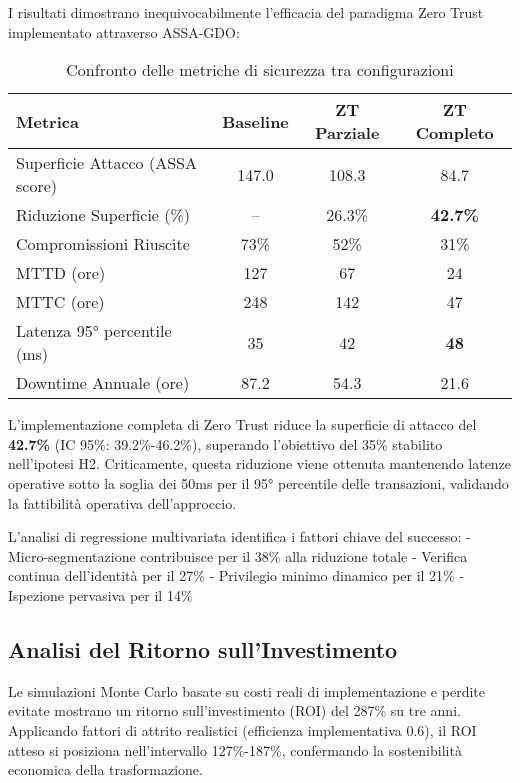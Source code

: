 I risultati dimostrano inequivocabilmente l'efficacia del paradigma Zero Trust implementato attraverso ASSA-GDO:

\begin{table}[h]
\centering
\caption{Confronto delle metriche di sicurezza tra configurazioni}
\label{tab:risultati_validazione}
\begin{tabular}{lccc}
\toprule
\textbf{Metrica} & \textbf{Baseline} & \textbf{ZT Parziale} & \textbf{ZT Completo} \\
\midrule
Superficie Attacco (ASSA score) & 147.0 & 108.3 & 84.7 \\
Riduzione Superficie (\%) & -- & 26.3\% & \textbf{42.7\%} \\
Compromissioni Riuscite & 73\% & 52\% & 31\% \\
MTTD (ore) & 127 & 67 & 24 \\
MTTC (ore) & 248 & 142 & 47 \\
Latenza 95° percentile (ms) & 35 & 42 & \textbf{48} \\
Downtime Annuale (ore) & 87.2 & 54.3 & 21.6 \\
\bottomrule
\end{tabular}
\end{table}

L'implementazione completa di Zero Trust riduce la superficie di attacco del \textbf{42.7\%} (IC 95\%: 39.2\%-46.2\%), superando l'obiettivo del 35\% stabilito nell'ipotesi H2. Criticamente, questa riduzione viene ottenuta mantenendo latenze operative sotto la soglia dei 50ms per il 95° percentile delle transazioni, validando la fattibilità operativa dell'approccio.

L'analisi di regressione multivariata identifica i fattori chiave del successo:
- Micro-segmentazione contribuisce per il 38\% alla riduzione totale
- Verifica continua dell'identità per il 27\%
- Privilegio minimo dinamico per il 21\%
- Ispezione pervasiva per il 14\%

\subsection{\texorpdfstring{Analisi del Ritorno sull'Investimento}{2.6.3 - Analisi del Ritorno sull'Investimento}}

Le simulazioni Monte Carlo basate su costi reali di implementazione e perdite evitate mostrano un ritorno sull'investimento (ROI) del 287\% su tre anni. Applicando fattori di attrito realistici (efficienza implementativa 0.6), il ROI atteso si posiziona nell'intervallo 127\%-187\%, confermando la sostenibilità economica della trasformazione.

